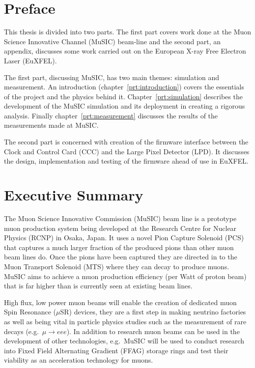 \chapter*{Preface} %
\label{cha:preface}
This thesis is divided into two parts. The first part covers work done at the Muon Science Innovative Channel (MuSIC) beam-line and the second part, an appendix, discusses some work carried out on the European X-ray Free Electron Laser (EuXFEL).

The first part, discussing MuSIC, has two main themes: simulation and measurement. An introduction (chapter~\ref{prt:introduction}) covers the essentials of the project and the physics behind it. Chapter~\ref{prt:simulation} describes the development of the MuSIC simulation  and its deployment in creating a rigorous analysis. Finally chapter~\ref{prt:measurement} discusses the results of the measurements made at MuSIC.

The second part is concerned with creation of the firmware interface between the Clock and Control Card (CCC) and the Large Pixel Detector (LPD). It discusses the design, implementation and testing of the firmware ahead of use in EuXFEL.

\chapter{Executive Summary} %
\label{cha:executive_summary}
The Muon Science Innovative Commission (MuSIC) beam line is a prototype muon production system being developed at the Research Centre for Nuclear Physics (RCNP) in Osaka, Japan. It uses a novel Pion Capture Solenoid (PCS) that captures a much larger fraction of the produced pions than other muon beam lines do. Once the pions have been captured they are directed in to the Muon Transport Solenoid (MTS) where they can decay to produce muons. MuSIC aims to achieve a muon production efficiency (per Watt of proton beam) that is far higher than is currently seen at existing beam lines. 

High flux, low power muon beams will enable the creation of dedicated muon Spin Resonance (\(\mu\)SR) devices, they are a first step in making neutrino factories as well as being vital in particle physics studies such as the measurement of rare decays (e.g.\ \(\mu\rightarrow eee\)). In addition to research muon beams can be used in the development of other technologies, e.g.\ MuSIC will be used to conduct research into Fixed Field Alternating Gradient (FFAG) storage rings and test their viability as an acceleration technology for muons.

